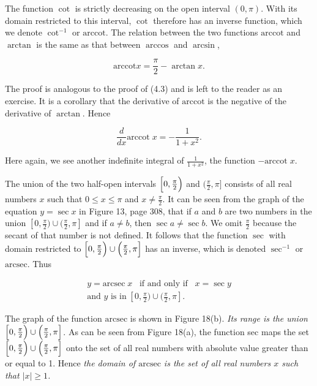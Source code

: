 The function $\cot$ is strictly decreasing on the open interval $(0, \pi)$. With its domain restricted to this interval, $\cot$ therefore has an inverse function, which we denote $\cot^{-1}$ or $\mathrm{arccot}$. 
The relation between the two functions $\mathrm{arccot}$ and $\arctan$ is the same as that between $\arccos$ and $\arcsin$,

\begin{theorem} %
$$
\mbox{arccot} x = \frac{\pi}{2} - \arctan x.
$$
\end{theorem}

The proof is analogous to the proof of (4.3) and is left to the reader as an exercise. It is a corollary that the derivative of $\mathrm{arccot}$ is the negative of the derivative of $\arctan$. Hence

\begin{theorem} %
$$
\frac{d}{dx}  \mathrm{arccot}\; x = - \frac{1}{1 + x^{2}}.
$$
\end{theorem}

Here again, we see another indefinite integral of $\frac{1}{1 + x^2}$, the function $-\mathrm{arccot}\; x$.

The union of the two half-open intervals $\Bigl[0, \frac{\pi}{2}\Bigr)$ and $(\frac{\pi}{2}, \pi]$ consists
of all real numbers $x$ such that $0 \leq x \leq \pi$ and $x \neq \frac{\pi}{2}$. It can be seen from 
the graph of the equation $y = \sec x$ in Figure 13, page 308, that if $a$ and $b$ are two numbers 
in the union $[0, \frac{\pi}{2}) \cup (\frac{\pi}{2}, \pi]$ and if $a \neq b$, then
$\sec a \neq \sec b$. We omit $\frac{\pi}{2}$ because the secant of that number is not defined. 
It follows that the function $\sec$ with domain restricted to $\Bigl[0, \frac{\pi}{2}\Bigr) \cup \Bigl(\frac{\pi}{2}, \pi\Bigr]$ has an inverse, which is denoted $\sec^{-1}$ or $\mathrm{arcsec}$.  Thus

$$
\begin{array}{c}
 y = \mathrm{arcsec}\; x \;\;\; \mbox{if and only if} \;\;\; x = \sec y  \\
 \mbox{and $y$ is in}\; [0, \frac{\pi}{2}) \cup (\frac{\pi}{2}, \pi].
\end{array}
$$

The graph of the function $\mathrm{arcsec}$ is shown in Figure 18(b). \textit{Its range is the union} $\Bigl[0,\frac{\pi}{2}\Bigr) \cup \Bigl(\frac{\pi}{2}, \pi \Bigr]$. As can be seen from Figure 18(a), the function sec maps the set $\Bigl[0, \frac{\pi}{2}\Bigr) \cup \Bigl(\frac{\pi}{2}, \pi \Bigr]$ onto the set of all real numbers with absolute value greater than or equal to 1. Hence \textit{the domain of $\mathrm{arcsec}$ is the set of all real numbers $x$ such that $|x| \geq 1$.}

